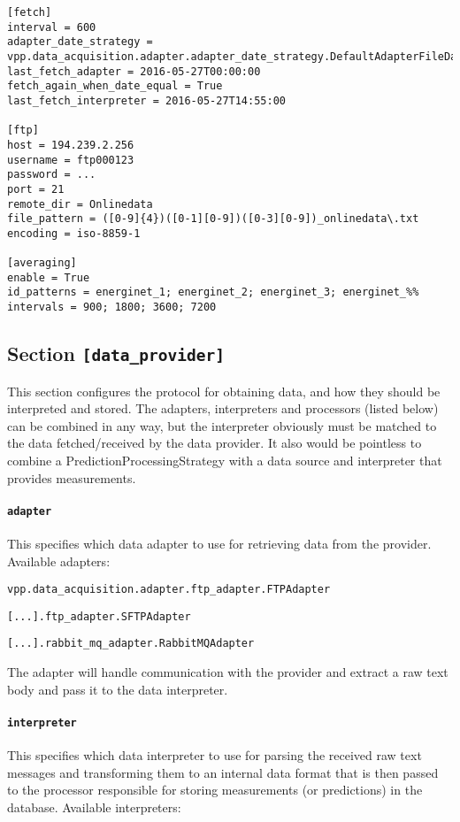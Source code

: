 {\begin{lstlisting}
[fetch]
interval = 600
adapter_date_strategy = vpp.data_acquisition.adapter.adapter_date_strategy.DefaultAdapterFileDateStrategy
last_fetch_adapter = 2016-05-27T00:00:00
fetch_again_when_date_equal = True
last_fetch_interpreter = 2016-05-27T14:55:00

[ftp]
host = 194.239.2.256
username = ftp000123
password = ...
port = 21
remote_dir = Onlinedata
file_pattern = ([0-9]{4})([0-1][0-9])([0-3][0-9])_onlinedata\.txt
encoding = iso-8859-1

[averaging]
enable = True
id_patterns = energinet_1; energinet_2; energinet_3; energinet_%%
intervals = 900; 1800; 3600; 7200
\end{lstlisting}

\subsection{Section \texttt{[data\_provider]}}
This section configures the protocol for obtaining data, and how they should be interpreted and stored. The adapters, interpreters and processors (listed below) can be combined in any way, but the interpreter obviously must be matched to the data fetched/received by the data provider. It also would be pointless to combine a PredictionProcessingStrategy with a data source and interpreter that provides measurements.

\paragraph{\texttt{adapter}} This specifies which data adapter to use for retrieving data from the provider. Available adapters:

\texttt{vpp.data\_acquisition.adapter.ftp\_adapter.FTPAdapter}

\texttt{[...].ftp\_adapter.SFTPAdapter}

\texttt{[...].rabbit\_mq\_adapter.RabbitMQAdapter}

The adapter will handle communication with the provider and extract a raw text body and pass it to the data interpreter.

\paragraph{\texttt{interpreter}} This specifies which data interpreter to use for parsing the received raw text messages and transforming them to an internal data format that is then passed to the processor responsible for storing measurements (or predictions) in the database. Available interpreters:

}
